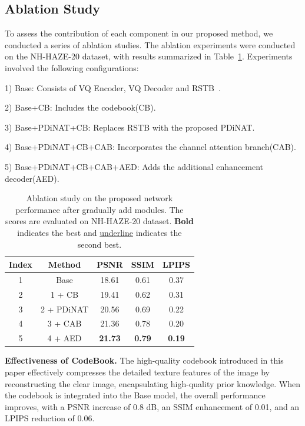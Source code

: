 \documentclass[journal]{IEEEtran}
\begin{document}
\subsection{Ablation Study}
To assess the contribution of each component in our proposed method, we conducted a series of ablation studies. The ablation experiments were conducted on the NH-HAZE-20 dataset, with results summarized in Table~\ref{Ablation_study_1}. Experiments involved the following configurations:

1) Base: Consists of VQ Encoder, VQ Decoder and RSTB~\cite{liang2021swinir}.

2) Base+CB: Includes the codebook(CB).

3) Base+PDiNAT+CB: Replaces RSTB with the proposed PDiNAT.

4) Base+PDiNAT+CB+CAB: Incorporates the channel attention branch(CAB).

5) Base+PDiNAT+CB+CAB+AED: Adds the additional enhancement decoder(AED).

\begin{table}
	\begin{center}
		\caption{Ablation study on the proposed network performance after gradually add modules. The scores are evaluated on NH-HAZE-20 dataset. \textbf{Bold} indicates the best and \underline{underline} indicates the second best.}
		\label{Ablation_study_1}
		\begin{tabular}{c | c | c | c | c }
			\hline
			Index & Method     & PSNR           & SSIM          & LPIPS         \\
			\hline
			1     & Base       & 18.61          & 0.61          & 0.37          \\
			2     & 1 + CB     & 19.41          & 0.62          & 0.31          \\
			3     & 2 + PDiNAT & 20.56          & 0.69          & 0.22          \\
			4     & 3 + CAB    & 21.36          & 0.78          & 0.20          \\
			5     & 4 + AED    & \textbf{21.73} & \textbf{0.79} & \textbf{0.19} \\
			\hline
		\end{tabular}
	\end{center}
\end{table}

{\bf{Effectiveness of CodeBook.}} The high-quality codebook introduced in this paper effectively compresses the detailed texture features of the image by reconstructing the clear image, encapsulating high-quality prior knowledge. When the codebook is integrated into the Base model, the overall performance improves, with a PSNR increase of 0.8 dB, an SSIM enhancement of 0.01, and an LPIPS reduction of 0.06.
\end{document}
